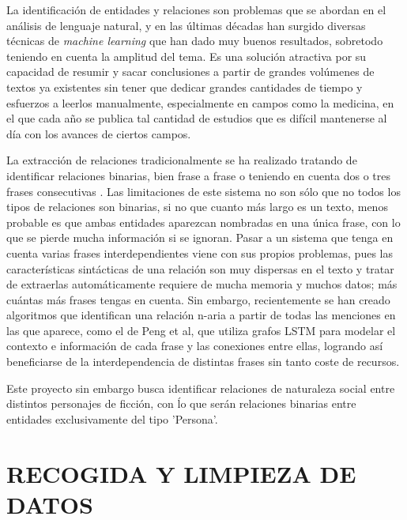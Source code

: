 \documentclass{pre-tfg}
\begin{document}
La identificación de entidades y relaciones son problemas que se abordan en el análisis de lenguaje natural, y en las últimas décadas han surgido diversas técnicas de \textit{machine learning} que han dado muy buenos resultados, sobretodo teniendo en cuenta la amplitud del tema. Es una solución atractiva por su capacidad de resumir y sacar conclusiones a partir de grandes volúmenes de textos ya existentes sin tener que dedicar grandes cantidades de tiempo y esfuerzos a leerlos manualmente, especialmente en campos como la medicina, en el que cada año se publica tal cantidad de estudios que es difícil mantenerse al día con los avances de ciertos campos.

La extracción de relaciones tradicionalmente se ha realizado tratando de identificar relaciones binarias, bien frase a frase o teniendo en cuenta dos o tres frases consecutivas\cite{zelenko_2003} \cite{craven_99}. Las limitaciones de este sistema no son sólo que no todos los tipos de relaciones son binarias, si no que cuanto más largo es un texto, menos probable es que ambas entidades aparezcan nombradas en una única frase, con lo que se pierde mucha información si se ignoran. Pasar a un sistema que tenga en cuenta varias frases interdependientes viene con sus propios problemas, pues las características sintácticas de una relación son muy dispersas en el texto y tratar de extraerlas automáticamente requiere de mucha memoria y muchos datos; más cuántas más frases tengas en cuenta. Sin embargo, recientemente se han creado algoritmos que identifican una relación n-aria a partir de todas las menciones en las que aparece, como el de Peng et al\cite{peng_17}, que utiliza grafos LSTM para modelar el contexto e información de cada frase y las conexiones entre ellas, logrando así beneficiarse de la interdependencia de distintas frases sin tanto coste de recursos.

Este proyecto sin embargo busca identificar relaciones de naturaleza social entre distintos personajes de ficción, con ĺo que serán relaciones binarias entre entidades exclusivamente del tipo 'Persona'. 





\section{RECOGIDA Y LIMPIEZA DE DATOS}
\end{document}
